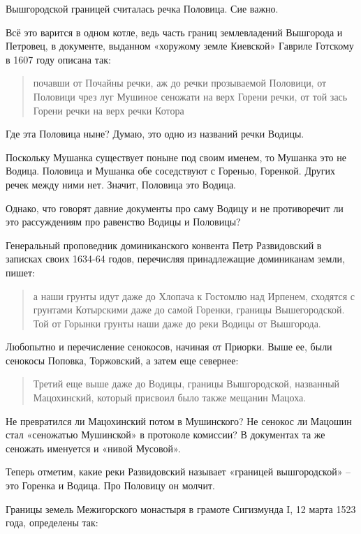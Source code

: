 Вышгородской границей считалась речка Половица. Сие важно.

Всё это варится в одном котле, ведь часть границ землевладений Вышгорода и Петровец, в документе, выданном «хоружому земле Киевской» Гавриле Готскому в 1607 году описана так:

\begin{quotation}
почавши от Почайны речки, аж до речки прозываемой Половици, от Половици чрез луг Мушиное сеножати на верх Горени речки, от той зась Горени речки на верх речки Котора
\end{quotation}

Где эта Половица ныне? Думаю, это одно из названий речки Водицы. 

Поскольку Мушанка существует поныне под своим именем, то Мушанка это не Водица. Половица и Мушанка обе соседствуют с Горенью, Горенкой. Других речек между ними нет. Значит, Половица это Водица.

Однако, что говорят давние документы про саму Водицу и не противоречит ли это рассуждениям про равенство Водицы и Половицы?

Генеральный проповедник доминиканского конвента Петр Развидовский в записках своих 1634-64 годов, перечисляя принадлежащие доминиканам земли, пишет:

\begin{quotation}
а наши грунты идут даже до Хлопача к Гостомлю над Ирпенем, сходятся с грунтами Котырскими даже до самой Горенки, границы Вышегородской. Той от Горынки грунты наши даже до реки Водицы от Вышгорода.
\end{quotation}

Любопытно и перечисление сенокосов, начиная от Приорки. Выше ее, были сенокосы Поповка, Торжовский, а затем еще севернее:

\begin{quotation}
Третий еще выше даже до Водицы, границы Вышгородской, названный Мацохинский, который присвоил было также мещанин Мацоха.\end{quotation}

Не превратился ли Мацохинский потом в Мушинского? Не сенокос ли Мацошин стал «сеножатью Мушинской» в протоколе комиссии? В документах та же сеножать именуется и «нивой Мусовой».

Теперь отметим, какие реки Развидовский называет «границей вышгородской» – это Горенка и Водица. Про Половицу он молчит.

Границы земель Межигорского монастыря в грамоте Сигизмунда I, 12 марта 1523 года, определены так:

